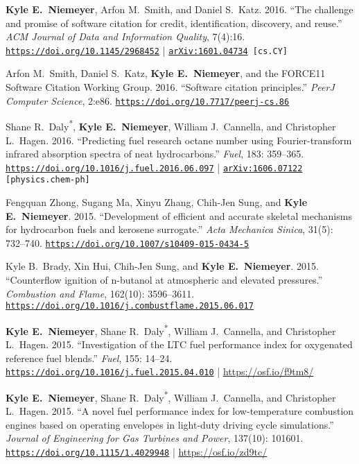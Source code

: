 \documentclass[margin,line,11pt]{res}
\makeatletter
\newlength{\bibhang}
\newlength{\bibsep}
 {\@listi \global\bibsep\itemsep \global\advance\bibsep by\parsep}
\newenvironment{bibenum*}
  {\renewcommand\labelenumi{\theenumi.}%
   \etaremune[
     topsep=0pt,
     itemsep=\bibsep,
     parsep=0pt,partopsep=0pt,
     itemindent=-\bibhang,
     leftmargin={\bibhang+\widthof{[999]}}]}
  {\endetaremune}
\newcommand*{\doi}[1]{\href{https://doi.org/#1}{\nolinkurl{https://doi.org/#1}}}
\makeatother
\begin{document}
\begin{resume}
\begin{bibenum*}
\item \textbf{Kyle E.~Niemeyer}, Arfon M.\ Smith, and Daniel S.\ Katz.
2016.
``The challenge and promise of software citation for credit, identification, discovery, and reuse.''
\emph{ACM Journal of Data and Information Quality}, 7(4):16.
\doi{10.1145/2968452} |
{\tt \href{http://arxiv.org/abs/1601.04734}{arXiv:1601.04734} [cs.CY]}

\item Arfon M.~Smith, Daniel S.~Katz, \textbf{Kyle E.~Niemeyer}, and the FORCE11 Software Citation Working Group.
2016.
``Software citation principles.''
\emph{PeerJ Computer Science}, 2:e86.
\doi{10.7717/peerj-cs.86}

\item Shane R.~Daly\textsuperscript{*}, \textbf{Kyle E.~Niemeyer}, William J.~Cannella, and Christopher L.~Hagen.
2016.
``Predicting fuel research octane number using Fourier-transform infrared absorption spectra of neat hydrocarbons.''
\emph{Fuel}, 183: 359--365.
\doi{10.1016/j.fuel.2016.06.097} |
{\tt \href{http://arxiv.org/abs/1606.07122}{arXiv:1606.07122} [physics.chem-ph]}

\item Fengquan Zhong, Sugang Ma, Xinyu Zhang, Chih-Jen Sung, and \textbf{Kyle E.~Niemeyer}.
2015.
``Development of efficient and accurate skeletal mechanisms for hydrocarbon fuels and kerosene surrogate.''
\emph{Acta Mechanica Sinica}, 31(5): 732--740.
\doi{10.1007/s10409-015-0434-5}

\item Kyle B.~Brady, Xin Hui, Chih-Jen Sung, and \textbf{Kyle E.~Niemeyer}.
2015.
``Counterflow ignition of n-butanol at atmospheric and elevated pressures.''
\emph{Combustion and Flame}, 162(10): 3596--3611.
\doi{10.1016/j.combustflame.2015.06.017}

\item \textbf{Kyle E.~Niemeyer}, Shane R.~Daly\textsuperscript{*}, William J.~Cannella, and Christopher L.~Hagen.
2015.
``Investigation of the LTC fuel performance index for oxygenated reference fuel blends.''
\emph{Fuel}, 155: 14--24.
\doi{10.1016/j.fuel.2015.04.010} | \url{https://osf.io/f9tm8/}

\item \textbf{Kyle E.~Niemeyer}, Shane R.\ Daly\textsuperscript{*}, William J.\ Cannella, and Christopher L.\ Hagen.
2015.
``A novel fuel performance index for low-temperature combustion engines based on operating envelopes in light-duty driving cycle simulations.''
\emph{Journal of Engineering for Gas Turbines and Power}, 137(10): 101601.
\doi{10.1115/1.4029948} | \url{https://osf.io/zd9tc/}


\end{bibenum*}
\end{resume}
\end{document}
